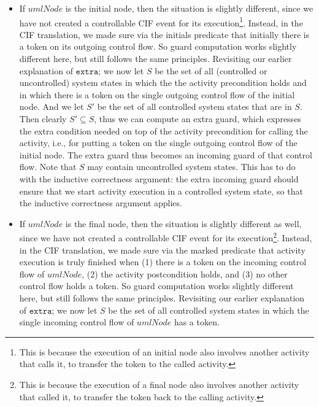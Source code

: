 \documentclass{article}
\theoremstyle{definition}
\begin{document}
\begin{itemize}
	Note that an execution of $\mathit{umlNode}$ is atomic and has no guards nor effects.
	Therefore, the execution of $\mathit{umlNode}$ can only follow a certain merge branch if a token can be taken from that incoming control flow, to which we have added the extra guard.
	\item If $\mathit{umlNode}$ is the initial node, then the situation is slightly different, since we have not created a controllable CIF event for its execution\footnote{This is because the execution of an initial node also involves another activity that calls it, to transfer the token to the called activity.}.
	Instead, in the CIF translation, we made sure via the initials predicate that initially there is a token on its outgoing control flow.
	So guard computation works slightly different here, but still follows the same principles.
	Revisiting our earlier explanation of $\texttt{extra}$; we now let $S$ be the set of all (controlled or uncontrolled) system states in which the the activity precondition holds and in which there is a token on the single outgoing control flow of the initial node.
	And we let $S'$ be the set of all controlled system states that are in $S$.
	Then clearly $S' \subseteq S$, thus we can compute an extra guard, which expresses the extra condition needed on top of the activity precondition for calling the activity, i.e., for putting a token on the single outgoing control flow of the initial node.
	The extra guard thus becomes an incoming guard of that control flow.
	Note that $S$ may contain uncontrolled system states.
	This has to do with the inductive correctness argument: the extra incoming guard should ensure that we start activity execution in a controlled system state, so that the inductive correctness argument applies.
	\item If $\mathit{umlNode}$ is the final node, then the situation is slightly different as well, since we have not created a controllable CIF event for its execution\footnote{This is because the execution of a final node also involves another activity that called it, to transfer the token back to the calling activity.}.
	Instead, in the CIF translation, we made sure via the marked predicate that activity execution is truly finished when (1) there is a token on the incoming control flow of $\mathit{umlNode}$, (2) the activity postcondition holds, and (3) no other control flow holds a token.
	So guard computation works slightly different here, but still follows the same principles.
	Revisiting our earlier explanation of $\texttt{extra}$; we now let $S$ be the set of all controlled system states in which the single incoming control flow of $\mathit{umlNode}$ has a token.

\end{itemize}
\end{document}

